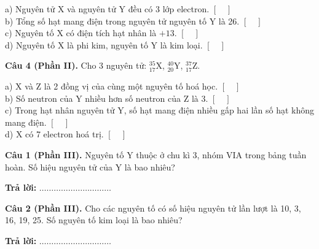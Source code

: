 \documentclass{article}
\begin{document}
a) Nguyên tử X và nguyên tử Y đều có 3 lớp electron. \hfill $[\quad]$\\[12pt]
b) Tổng số hạt mang điện trong nguyên tử nguyên tố Y là 26. \hfill $[\quad]$\\[12pt]
c) Nguyên tố X có điện tích hạt nhân là $+13$. \hfill $[\quad]$\\[12pt]
d) Nguyên tố X là phi kim, nguyên tố Y là kim loại. \hfill $[\quad]$
\vspace*{\fill}
\newpage

\fontsize{26}{34}\selectfont
\textbf{Câu 4 (Phần II).} Cho 3 nguyên tử: $_{17}^{35}\text{X}$, $_{20}^{40}\text{Y}$, $_{17}^{37}\text{Z}$.
\vspace{16pt}

a) X và Z là 2 đồng vị của cùng một nguyên tố hoá học. \hfill $[\quad]$\\[14pt]
b) Số neutron của Y nhiều hơn số neutron của Z là 3. \hfill $[\quad]$\\[14pt]
c) Trong hạt nhân nguyên tử Y, số hạt mang điện nhiều gấp hai lần số hạt không mang điện. \hfill $[\quad]$\\[14pt]
d) X có 7 electron hoá trị. \hfill $[\quad]$
\vspace*{\fill}
\newpage


\fontsize{32}{42}\selectfont
\textbf{Câu 1 (Phần III).} Nguyên tố Y thuộc ở chu kì 3, nhóm VIA trong bảng tuần hoàn. Số hiệu nguyên tử của Y là bao nhiêu?
\vspace{20pt}

\textbf{Trả lời:} $\dots\dots\dots\dots\dots\dots\dots\dots\dots\dots$
\vspace*{\fill}
\newpage

\fontsize{32}{42}\selectfont
\textbf{Câu 2 (Phần III).} Cho các nguyên tố có số hiệu nguyên tử lần lượt là 10, 3, 16, 19, 25. Số nguyên tố kim loại là bao nhiêu?
\vspace{20pt}

\textbf{Trả lời:} $\dots\dots\dots\dots\dots\dots\dots\dots\dots\dots$
\vspace*{\fill}
\newpage
\end{document}
